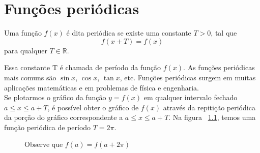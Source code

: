
\chapter{Funções periódicas}

\begin{definicao}
\label{def1}
    
Uma função $f(x)$ é dita periódica se existe uma constante $T > 0$, tal que 
\begin{equation}
    f(x + T) = f(x)
\end{equation}
para qualquer $T \in \mathbb{R}$. 
\end{definicao}
Essa constante T é chamada de período da função $f(x)$. As funções periódicas 
mais comuns são $\sin{x}$, $\cos{x}$, $\tan{x}$, etc. Funções periódicas surgem
em muitas aplicações matemáticas e em problemas de física e engenharia. 
\\
Se plotarmos o gráfico da função $y=f(x)$ em qualquer intervalo fechado 
\mbox{$a \leq x \leq a + T$}, é possível obter o gráfico de $f(x)$ através da 
repitição periódica da porção do gráfico correspondente a \mbox{$a \leq x \leq a + T$}.
Na figura ~\ref{fig:periodExp}, temos uma função periódica de período $T=2\pi$.
\\
\begin{figure}[H]
    \caption{Observe que $f(a) = f(a + 2\pi)$}
    \label{fig:periodExp}
\end{figure}

